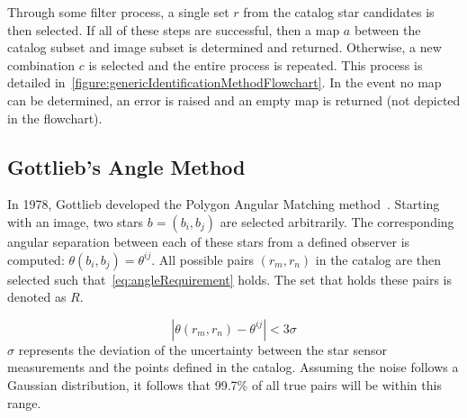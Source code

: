 Through some filter process, a single set $r$ from the catalog star candidates is then selected.
If all of these steps are successful, then a map $a$ between the catalog subset and image subset is determined and
returned.
Otherwise, a new combination $c$ is selected and the entire process is repeated.
This process is detailed in~\autoref{figure:genericIdentificationMethodFlowchart}.
In the event no map can be determined, an error is raised and an empty map is returned (not depicted in the flowchart).


\subsection{Gottlieb's Angle Method}\label{subsec:gottlieb'sAngleMethod}
In 1978, Gottlieb developed the Polygon Angular Matching method~\cite{Angle,AnalysisUncompensated}.
Starting with an image, two stars $b = (b_i, b_j)$ are selected arbitrarily.
The corresponding angular separation between each of these stars from a defined observer is computed:
$\theta (b_i, b_j) = \theta^{ij}$.
All possible pairs $(r_m, r_n)$ in the catalog are then selected such that~\autoref{eq:angleRequirement} holds.
The set that holds these pairs is denoted as $R$.

\begin{equation}
    \label{eq:angleRequirement}
    \left\lvert  \theta(r_m, r_n) - \theta^{ij} \right\rvert < 3 \sigma
\end{equation}
$\sigma$ represents the deviation of the uncertainty between the star sensor measurements and the points defined in the
catalog.
Assuming the noise follows a Gaussian distribution, it follows that 99.7\% of all true pairs will be within this range.

